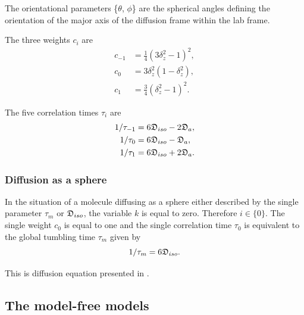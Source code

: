 \noindent The orientational parameters \{$\theta$, $\phi$\} are the spherical angles defining the orientation of the major axis of the diffusion frame within the lab frame.


The three weights $c_i$ are
\begin{subequations}
\begin{align}
    c_{-1} &= \tfrac{1}{4}(3\delta_z^2 - 1)^2, \label{eq: spheroid c-1} \\
    c_{0}  &= 3\delta_z^2(1 - \delta_z^2),     \label{eq: spheroid c0} \\
    c_{1}  &= \tfrac{3}{4}(\delta_z^2 - 1)^2.  \label{eq: spheroid c1}
\end{align}
\end{subequations}

The five correlation times $\tau_i$ are
\begin{subequations}
\begin{align}
    1/\tau_{-1} &= 6\mathfrak{D}_{iso} - 2\mathfrak{D}_a,    \label{eq: spheroid tau-1} \\
    1/\tau_{0}  &= 6\mathfrak{D}_{iso} - \mathfrak{D}_a,     \label{eq: spheroid tau0} \\
    1/\tau_{1}  &= 6\mathfrak{D}_{iso} + 2\mathfrak{D}_a.    \label{eq: spheroid tau1}
\end{align}
\end{subequations}



\subsubsection{Diffusion as a sphere}

In the situation of a molecule diffusing as a sphere either described by the single parameter $\tau_m$ or $\mathfrak{D}_{iso}$, the variable $k$ is equal to zero.
Therefore $i \in \{0\}$.
The single weight $c_0$ is equal to one and the single correlation time $\tau_0$ is equivalent to the global tumbling time $\tau_m$ given by
\begin{equation} \label{eq: sphere tau0}
    1/\tau_m = 6\mathfrak{D}_{iso}.
\end{equation}

\noindent This is diffusion equation presented in \citet{Bloembergen48}.



\subsection{The model-free models}

